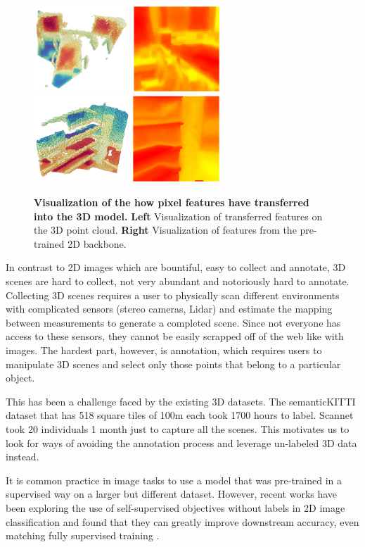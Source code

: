 \documentclass[10pt,twocolumn,letterpaper]{article}
\begin{document}
\begin{figure}
    \centering
    \includegraphics[width=7cm]{images/experiments/image-to-point-vis1.png}
    \includegraphics[width=7cm]{images/experiments/image-to-point-vis2.png}
    \caption{\textbf{Visualization of the how pixel features have transferred into the 3D model.} \textbf{Left} Visualization of transferred features on the 3D point cloud. \textbf{Right}  Visualization of features from the pre-trained 2D backbone.}
    \label{fig:features2d-3dvis}
\end{figure}

In contrast to 2D images which are bountiful, easy to collect and annotate, 3D scenes are hard to collect, not very abundant and notoriously hard to annotate. Collecting 3D scenes requires a user to physically scan different environments with complicated sensors (\eg stereo cameras, Lidar) and estimate the mapping between measurements to generate a completed scene. Since not everyone has access to these sensors, they cannot be easily scrapped off of the web like with images. The hardest part, however, is annotation, which requires users to manipulate 3D scenes and select only those points that belong to a particular object.

This has been a challenge faced by the existing 3D datasets. The semanticKITTI dataset \cite{behley2019semantic} that has 518 square tiles of 100m each took 1700 hours to label. Scannet took 20 individuals 1 month just to capture all the scenes. This motivates us to look for ways of avoiding the annotation process and leverage un-labeled 3D data instead.

It is common practice in image tasks to use a model that was pre-trained in a supervised way on a larger but different dataset. However, recent works have been exploring the use of self-supervised objectives without labels in 2D image classification and found that they can greatly improve downstream accuracy, even matching fully supervised training \cite{grill_bootstrap_nodate}.
\end{document}
